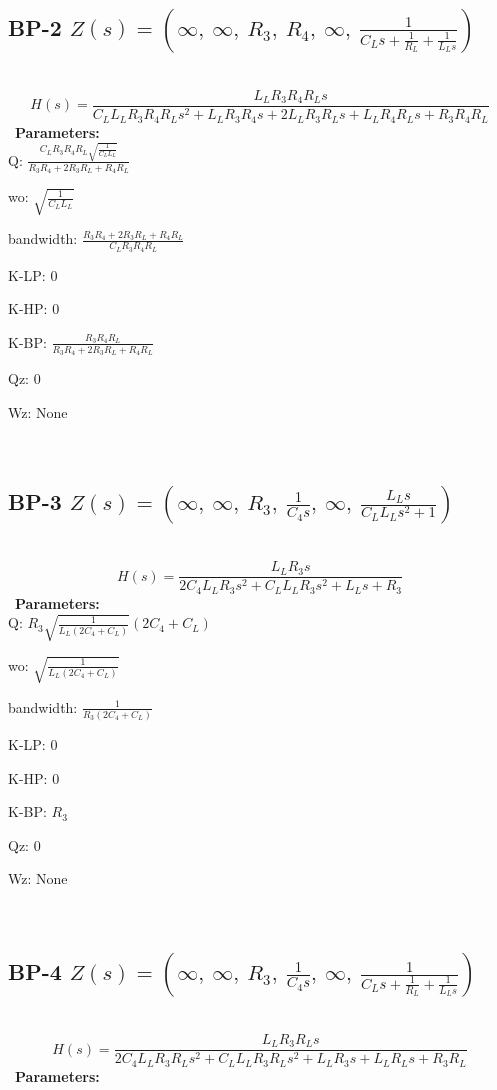 \documentclass{article}
\begin{document}
\ 

\subsection{BP-2 $Z(s) = \left( \infty, \  \infty, \  R_{3}, \  R_{4}, \  \infty, \  \frac{1}{C_{L} s + \frac{1}{R_{L}} + \frac{1}{L_{L} s}}\right)$ } \ 
\textbf{\[H(s) = \frac{L_{L} R_{3} R_{4} R_{L} s}{C_{L} L_{L} R_{3} R_{4} R_{L} s^{2} + L_{L} R_{3} R_{4} s + 2 L_{L} R_{3} R_{L} s + L_{L} R_{4} R_{L} s + R_{3} R_{4} R_{L}}\] } \ 
\textbf{Parameters:}\\ 

Q: $\frac{C_{L} R_{3} R_{4} R_{L} \sqrt{\frac{1}{C_{L} L_{L}}}}{R_{3} R_{4} + 2 R_{3} R_{L} + R_{4} R_{L}}$\ 

wo: $\sqrt{\frac{1}{C_{L} L_{L}}}$\ 

bandwidth: $\frac{R_{3} R_{4} + 2 R_{3} R_{L} + R_{4} R_{L}}{C_{L} R_{3} R_{4} R_{L}}$\ 

K-LP: $0$\ 

K-HP: $0$\ 

K-BP: $\frac{R_{3} R_{4} R_{L}}{R_{3} R_{4} + 2 R_{3} R_{L} + R_{4} R_{L}}$\ 

Qz: $0$\ 

Wz: $\text{None}$\ 

\ 

\subsection{BP-3 $Z(s) = \left( \infty, \  \infty, \  R_{3}, \  \frac{1}{C_{4} s}, \  \infty, \  \frac{L_{L} s}{C_{L} L_{L} s^{2} + 1}\right)$ } \ 
\textbf{\[H(s) = \frac{L_{L} R_{3} s}{2 C_{4} L_{L} R_{3} s^{2} + C_{L} L_{L} R_{3} s^{2} + L_{L} s + R_{3}}\] } \ 
\textbf{Parameters:}\\ 

Q: $R_{3} \sqrt{\frac{1}{L_{L} \left(2 C_{4} + C_{L}\right)}} \left(2 C_{4} + C_{L}\right)$\ 

wo: $\sqrt{\frac{1}{L_{L} \left(2 C_{4} + C_{L}\right)}}$\ 

bandwidth: $\frac{1}{R_{3} \left(2 C_{4} + C_{L}\right)}$\ 

K-LP: $0$\ 

K-HP: $0$\ 

K-BP: $R_{3}$\ 

Qz: $0$\ 

Wz: $\text{None}$\ 

\ 

\subsection{BP-4 $Z(s) = \left( \infty, \  \infty, \  R_{3}, \  \frac{1}{C_{4} s}, \  \infty, \  \frac{1}{C_{L} s + \frac{1}{R_{L}} + \frac{1}{L_{L} s}}\right)$ } \ 
\textbf{\[H(s) = \frac{L_{L} R_{3} R_{L} s}{2 C_{4} L_{L} R_{3} R_{L} s^{2} + C_{L} L_{L} R_{3} R_{L} s^{2} + L_{L} R_{3} s + L_{L} R_{L} s + R_{3} R_{L}}\] } \ 
\textbf{Parameters:}\\ 
\end{document}
